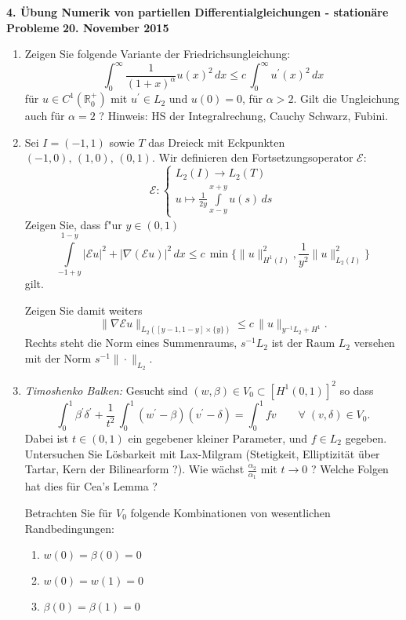\documentclass[11pt,a4paper]{report}
\newcommand{\R}[1]{\mathbb{R}^{#1}}
\begin{document}
\begin{center}
\textbf{4. \"Ubung Numerik von partiellen Differentialgleichungen - station\"are Probleme} \newline 
\textbf{20. November 2015}
\end{center}
\begin{enumerate}

\item 
Zeigen Sie folgende Variante der Friedrichsungleichung:
$$
\int_0^\infty  \frac{1} {(1+x)^\alpha} u(x)^2 \, dx \leq c \, \int_0^\infty
u^\prime(x)^2 \, dx
$$
f\"ur $u \in C^1(\R{+}_0)$ mit $u^\prime \in L_2$ und $u(0) = 0$,  f\"ur $\alpha > 2$. Gilt
die Ungleichung auch f\"ur $\alpha = 2$ ?
Hinweis: HS der Integralrechung, Cauchy Schwarz, Fubini. 


\item Sei $I=(-1, 1)$ sowie $T$ das Dreieck mit Eckpunkten $(-1,0),\,(1,0),\,(0,1)$. Wir definieren den Fortsetzungsoperator $\mathcal{E}$:
$$\mathcal{E}: \left\{
							\begin{matrix}   L_2(I) \rightarrow L_2(T) \\ 
					 									u \mapsto \frac{1}{2y}\int\limits_{x-y}^{x+y}u(s) \,ds
					    \end{matrix}\right.$$
Zeigen Sie, dass f"ur $y\in (0,1)$ 
$$\int\limits_{-1+y}^{1-y} |\mathcal{E}u|^2 + |\nabla(\mathcal{E}u)|^2\,dx \leq c\, \min\{\|u\|^2_{H^1(I)}, \frac{1}{y^2}\|u\|^2_{L_2(I)}\}$$
gilt.

Zeigen Sie damit weiters
$$
\| \nabla \mathcal{E}u \|_{L_2([y-1,1-y] \times \{y\}) } \leq c \, \|u \|_{y^{-1}L_2 + H^1}.
$$
Rechts steht die Norm eines Summenraums, $s^{-1}L_2$ ist der Raum $L_2$
versehen mit der \newline Norm $s^{-1}\| \cdot \|_{L_2}$.




\item {\em Timoshenko Balken:} Gesucht sind $(w, \beta) \in V_0 \subset
  [H^1(0,1)]^2$ so dass
$$
\int_0^1 \beta^\prime \delta ^\prime + \frac{1}{t^2}\,\int_0^1
(w^\prime - \beta) (v^\prime - \delta) = \int_0^1 f v \qquad \forall \;
(v,\delta) \in V_0.
$$
Dabei ist $t \in (0,1)$ ein gegebener kleiner Parameter, und $f \in L_2$ gegeben. Untersuchen Sie L\"osbarkeit
mit Lax-Milgram (Stetigkeit, Elliptizit\"at \"uber Tartar, Kern der
Bilinearform ?). Wie
w\"achst $\frac{\alpha_2} {\alpha_1}$ mit $t \rightarrow 0$ ? Welche
Folgen hat dies f\"ur Cea's Lemma ?

Betrachten Sie f\"ur $V_0$ folgende Kombinationen von wesentlichen Randbedingungen:
\begin{enumerate}
\item $w(0) = \beta(0) = 0$
\item $w(0) = w(1) = 0$
\item $\beta(0) = \beta(1) = 0$
\end{enumerate}


\end{enumerate}
\end{document}
